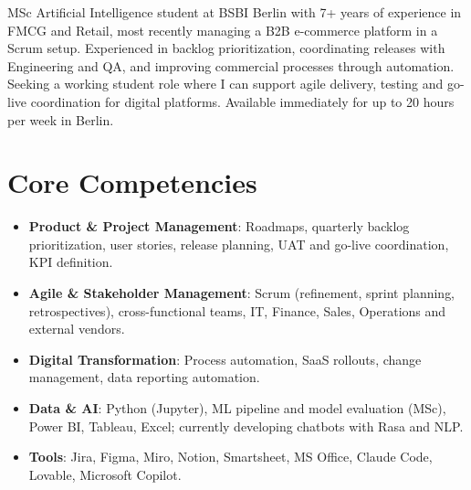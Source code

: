\documentclass[11pt,a4paper,sans]{moderncv}
\begin{document}
\makecvtitle


\vspace{6pt}
\small{MSc Artificial Intelligence student at BSBI Berlin with 7+ years of experience in FMCG and Retail, most recently managing a B2B e-commerce platform in a Scrum setup. Experienced in backlog prioritization, coordinating releases with Engineering and QA, and improving commercial processes through automation. Seeking a working student role where I can support agile delivery, testing and go-live coordination for digital platforms. Available immediately for up to 20 hours per week in Berlin.}


\section{Core Competencies}
\vspace{1pt}
\begin{itemize}

\item \textbf{Product \& Project Management}: Roadmaps, quarterly backlog prioritization, user stories, release planning, UAT and go-live coordination, KPI definition.

\item \textbf{Agile \& Stakeholder Management}: Scrum (refinement, sprint planning, retrospectives), cross-functional teams, IT, Finance, Sales, Operations and external vendors.

\item \textbf{Digital Transformation}: Process automation, SaaS rollouts, change management, data reporting automation.

\item \textbf{Data \& AI}: Python (Jupyter), ML pipeline and model evaluation (MSc), Power BI, Tableau, Excel; currently developing chatbots with Rasa and NLP.

\item \textbf{Tools}: Jira, Figma, Miro, Notion, Smartsheet, MS Office, Claude Code, Lovable, Microsoft Copilot.

\end{itemize}
\end{document}
